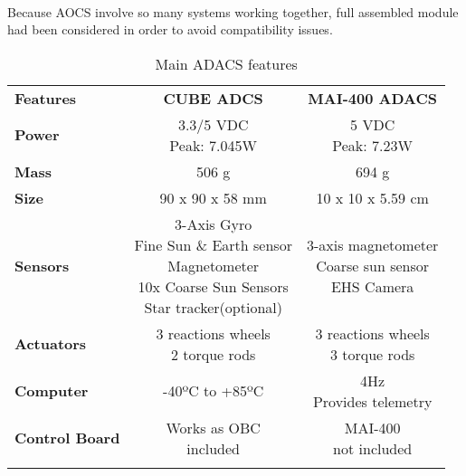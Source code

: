 \paragraph{} Because AOCS involve so many systems working together, full assembled module had been considered in order to avoid compatibility issues. 
\begin{longtable}{| l | c | c |}
	
	\hline
	\rowcolor[gray]{0.60} \multicolumn{3}{|c|}{\textbf{ADACS options }} \\
	\hline
	
	\hline
	\rowcolor[gray]{0.75}	\textbf{Features} &  \textbf{CUBE ADCS} & \textbf{MAI-400 ADACS} \\
	\hline
	
	\cellcolor[gray]{0.85} \textbf{Power} &\makecell{3.3/5 VDC\\ Peak: 7.045W }&  \makecell{5 VDC\\Peak: 7.23W}  \\ 	\hline
	\cellcolor[gray]{0.85} \textbf{Mass} & 506 g& 694 g\\ \hline
	\cellcolor[gray]{0.85} \textbf{Size} & 90 x 90 x 58 mm&10 x 10 x 5.59 cm \\ \hline
	\cellcolor[gray]{0.85} \textbf{Sensors} & \makecell{3-Axis Gyro\\Fine Sun \& Earth sensor \\ Magnetometer\\10x Coarse Sun Sensors \\Star tracker(optional)}& \makecell{3-axis magnetometer \\Coarse sun sensor\\EHS Camera}\\ 	\hline
	\cellcolor[gray]{0.85} \textbf{Actuators} &  \makecell{3 reactions wheels\\2 torque rods} & \makecell{3 reactions wheels\\3 torque rods}\\ 	\hline
	\cellcolor[gray]{0.85} \textbf{Computer} & -40ºC to +85ºC & \makecell{4Hz\\Provides telemetry}\\ \hline
	\cellcolor[gray]{0.85} \textbf{Control Board} & \makecell{Works as OBC\\included}& \makecell{MAI-400\\ not included}\\
	\hline
	
	\caption{Main ADACS features}
	\label{ADACS}
	
\end{longtable}